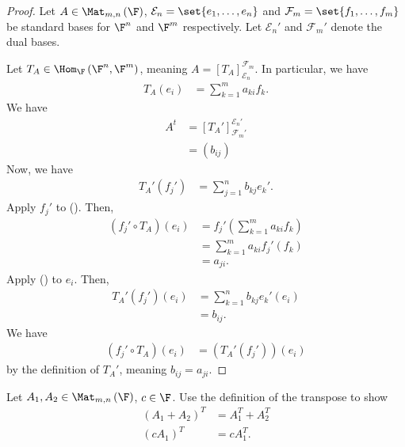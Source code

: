 \documentclass[10pt]{mypackage}
\begin{document}
\begin{proof}
  Let $A\in \Mat_{m,n}\left(\F\right)$, $\mathcal{E}_n = \set{e_1,\dots,e_n}$ and $\mathcal{F}_m = \set{f_1,\dots,f_m}$ be standard bases for $\F^n$ and $\F^m$ respectively. Let $\mathcal{E}_n'$ and $\mathcal{F}_m'$ denote the dual bases.\newline

  Let $T_A \in \Hom_\F\left(\F^n,\F^m\right)$, meaning $A = \left[T_A\right]_{\mathcal{E}_n}^{\mathcal{F}_m}$. In particular, we have
  \begin{align*}
    T_A\left(e_i\right) &= \sum_{k=1}^{m}a_{ki}f_k. \tag*{(\textasteriskcentered)}
  \end{align*}
  We have
  \begin{align*}
    A^{t} &= \left[T_{A}'\right]_{\mathcal{F}_m'}^{\mathcal{E}_n'} \tag*{(\textasteriskcentered\textasteriskcentered)}\\
          &= \left(b_{ij}\right)
  \end{align*}
  Now, we have
  \begin{align*}
    T_{A}' \left(f_j'\right) &= \sum_{j=1}^{n}b_{kj}e_{k}'.
  \end{align*}
  Apply $f_j'$ to (\textasteriskcentered). Then,
  \begin{align*}
    \left(f_j'\circ T_A\right)\left(e_i\right) &= f_j'\left(\sum_{k=1}^{m}a_{ki}f_k\right)\\
                                               &= \sum_{k=1}^{m}a_{ki}f_j'\left(f_k\right)\\
                                               &= a_{ji}.
  \end{align*}
  Apply (\textasteriskcentered\textasteriskcentered) to $e_i$. Then,
  \begin{align*}
    T_A'\left(f_j'\right)\left(e_i\right) &= \sum_{k=1}^{n}b_{kj}e_k'\left(e_i\right)\\
                                          &= b_{ij}.
  \end{align*}
  We have
  \begin{align*}
    \left(f_j'\circ T_A\right)\left(e_i\right) &= \left(T_A'\left(f_j'\right)\right)\left(e_i\right)
  \end{align*}
  by the definition of $T_A'$, meaning $b_{ij} = a_{ji}$.
\end{proof}
\begin{exercise}
  Let $A_1,A_2\in \Mat_{m,n}\left(\F\right)$, $c\in \F$. Use the definition of the transpose to show
  \begin{align*}
    \left(A_1 + A_2\right)^{T} &= A_1^T + A_2^T\\
    \left(cA_1\right)^T &= cA_1^T.
  \end{align*}
\end{exercise}
\end{document}
